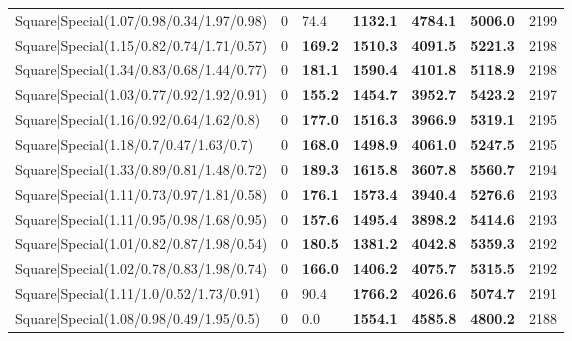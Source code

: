 \begin{tabular}{lrllllr}
 Square|Special(1.07/0.98/0.34/1.97/0.98)                      &             0   & 74.4           & \textbf{1132.1} & \textbf{4784.1} & \textbf{5006.0} &         2199 \\
 Square|Special(1.15/0.82/0.74/1.71/0.57)                      &             0   & \textbf{169.2} & \textbf{1510.3} & \textbf{4091.5} & \textbf{5221.3} &         2198 \\
 Square|Special(1.34/0.83/0.68/1.44/0.77)                      &             0   & \textbf{181.1} & \textbf{1590.4} & \textbf{4101.8} & \textbf{5118.9} &         2198 \\
 Square|Special(1.03/0.77/0.92/1.92/0.91)                      &             0   & \textbf{155.2} & \textbf{1454.7} & \textbf{3952.7} & \textbf{5423.2} &         2197 \\
 Square|Special(1.16/0.92/0.64/1.62/0.8)                       &             0   & \textbf{177.0} & \textbf{1516.3} & \textbf{3966.9} & \textbf{5319.1} &         2195 \\
 Square|Special(1.18/0.7/0.47/1.63/0.7)                        &             0   & \textbf{168.0} & \textbf{1498.9} & \textbf{4061.0} & \textbf{5247.5} &         2195 \\
 Square|Special(1.33/0.89/0.81/1.48/0.72)                      &             0   & \textbf{189.3} & \textbf{1615.8} & \textbf{3607.8} & \textbf{5560.7} &         2194 \\
 Square|Special(1.11/0.73/0.97/1.81/0.58)                      &             0   & \textbf{176.1} & \textbf{1573.4} & \textbf{3940.4} & \textbf{5276.6} &         2193 \\
 Square|Special(1.11/0.95/0.98/1.68/0.95)                      &             0   & \textbf{157.6} & \textbf{1495.4} & \textbf{3898.2} & \textbf{5414.6} &         2193 \\
 Square|Special(1.01/0.82/0.87/1.98/0.54)                      &             0   & \textbf{180.5} & \textbf{1381.2} & \textbf{4042.8} & \textbf{5359.3} &         2192 \\
 Square|Special(1.02/0.78/0.83/1.98/0.74)                      &             0   & \textbf{166.0} & \textbf{1406.2} & \textbf{4075.7} & \textbf{5315.5} &         2192 \\
 Square|Special(1.11/1.0/0.52/1.73/0.91)                       &             0   & 90.4           & \textbf{1766.2} & \textbf{4026.6} & \textbf{5074.7} &         2191 \\
 Square|Special(1.08/0.98/0.49/1.95/0.5)                       &             0   & 0.0            & \textbf{1554.1} & \textbf{4585.8} & \textbf{4800.2} &         2188 \\

\end{tabular}
